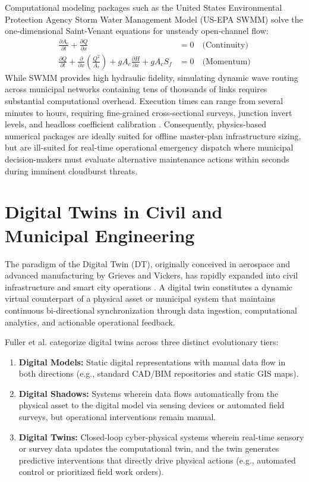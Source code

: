 Computational modeling packages such as the United States Environmental Protection Agency Storm Water Management Model (US-EPA SWMM) \cite{rossman2015storm} solve the one-dimensional Saint-Venant equations for unsteady open-channel flow:
\begin{align}
\frac{\partial A_c}{\partial t} + \frac{\partial Q}{\partial x} &= 0 \quad \text{(Continuity)} \\
\frac{\partial Q}{\partial t} + \frac{\partial}{\partial x}\left(\frac{Q^2}{A_c}\right) + g A_c \frac{\partial H}{\partial x} + g A_c S_f &= 0 \quad \text{(Momentum)}
\end{align}
While SWMM provides high hydraulic fidelity, simulating dynamic wave routing across municipal networks containing tens of thousands of links requires substantial computational overhead. Execution times can range from several minutes to hours, requiring fine-grained cross-sectional surveys, junction invert levels, and headloss coefficient calibration \cite{rossman2015storm}. Consequently, physics-based numerical packages are ideally suited for offline master-plan infrastructure sizing, but are ill-suited for real-time operational emergency dispatch where municipal decision-makers must evaluate alternative maintenance actions within seconds during imminent cloudburst threats.

\section{Digital Twins in Civil and Municipal Engineering}
The paradigm of the Digital Twin (DT), originally conceived in aerospace and advanced manufacturing by Grieves and Vickers, has rapidly expanded into civil infrastructure and smart city operations \cite{batty2018digital, tao2019digital}. A digital twin constitutes a dynamic virtual counterpart of a physical asset or municipal system that maintains continuous bi-directional synchronization through data ingestion, computational analytics, and actionable operational feedback.

Fuller et al. \cite{fuller2020digital} categorize digital twins across three distinct evolutionary tiers:
\begin{enumerate}
    \item \textbf{Digital Models:} Static digital representations with manual data flow in both directions (e.g., standard CAD/BIM repositories and static GIS maps).
    \item \textbf{Digital Shadows:} Systems wherein data flows automatically from the physical asset to the digital model via sensing devices or automated field surveys, but operational interventions remain manual.
    \item \textbf{Digital Twins:} Closed-loop cyber-physical systems wherein real-time sensory or survey data updates the computational twin, and the twin generates predictive interventions that directly drive physical actions (e.g., automated control or prioritized field work orders).
\end{enumerate}


